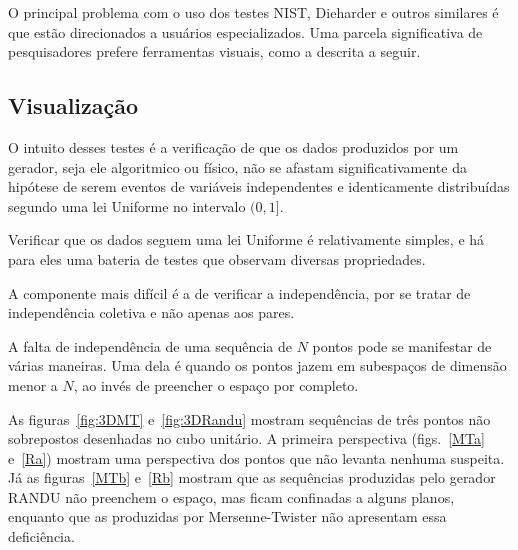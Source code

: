 %   

  

O principal problema com o uso dos testes NIST, Dieharder e outros similares é que estão direcionados a usuários especializados.
Uma parcela significativa de pesquisadores prefere ferramentas visuais, como a descrita a seguir.

\subsection{Visualização}

O intuito desses testes é a verificação de que os dados produzidos por um gerador, seja ele algoritmico ou físico, não se afastam significativamente da hipótese de serem eventos de variáveis independentes e identicamente distribuídas segundo uma lei Uniforme no intervalo $(0,1]$.

Verificar que os dados seguem uma lei Uniforme é relativamente simples, e há para eles uma bateria de testes que observam diversas propriedades.

A componente mais difícil é a de verificar a independência, por se tratar de independência coletiva e não apenas aos pares.

A falta de independência de uma sequência de $N$ pontos pode se manifestar de várias maneiras.
Uma dela é quando os pontos jazem em subespaços de dimensão menor a $N$, ao invés de preencher o espaço por completo.

As figuras~\ref{fig:3DMT} e~\ref{fig:3DRandu} mostram sequências de três pontos não sobrepostos desenhadas no cubo unitário.
A primeira perspectiva (figs.~\ref{MTa} e~\ref{Ra}) mostram uma perspectiva dos pontos que não levanta nenhuma suspeita.
Já as figuras~\ref{MTb} e~\ref{Rb} mostram que as sequências produzidas pelo gerador RANDU não preenchem o espaço, mas ficam confinadas a alguns planos, enquanto que as produzidas por Mersenne-Twister não apresentam essa deficiência.

